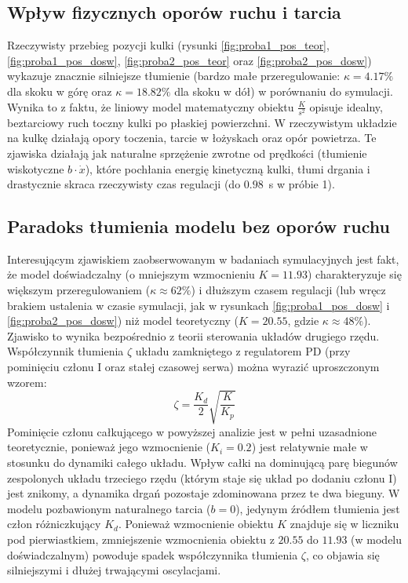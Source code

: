 \subsection{Wpływ fizycznych oporów ruchu i tarcia}
Rzeczywisty przebieg pozycji kulki (rysunki \ref{fig:proba1_pos_teor},
\ref{fig:proba1_pos_dosw}, \ref{fig:proba2_pos_teor} oraz
\ref{fig:proba2_pos_dosw}) wykazuje znacznie silniejsze tłumienie (bardzo małe
przeregulowanie: $\kappa = 4.17\%$ dla skoku w górę oraz $\kappa = 18.82\%$ dla
skoku w dół) w porównaniu do symulacji. Wynika to z faktu, że
liniowy model matematyczny obiektu $\frac{K}{s^2}$ opisuje idealny, beztarciowy
ruch toczny kulki po płaskiej powierzchni. W rzeczywistym układzie na kulkę
działają opory toczenia, tarcie w łożyskach oraz opór powietrza. Te zjawiska
działają jak naturalne sprzężenie zwrotne od prędkości (tłumienie wiskotyczne
$b\cdot\dot{x}$), które pochłania energię kinetyczną kulki, tłumi drgania
i drastycznie skraca rzeczywisty czas regulacji (do $0.98$~s w próbie 1).

\subsection{Paradoks tłumienia modelu bez oporów ruchu}
Interesującym zjawiskiem zaobserwowanym w badaniach symulacyjnych jest fakt,
że model doświadczalny (o mniejszym wzmocnieniu $K=11.93$) charakteryzuje się
większym przeregulowaniem ($\kappa \approx 62\%$) i dłuższym czasem regulacji
(lub wręcz brakiem ustalenia w czasie symulacji, jak w rysunkach
\ref{fig:proba1_pos_dosw} i \ref{fig:proba2_pos_dosw}) niż model teoretyczny
($K=20.55$, gdzie $\kappa \approx 48\%$). Zjawisko to wynika bezpośrednio
z teorii sterowania układów drugiego rzędu. Współczynnik tłumienia $\zeta$
układu zamkniętego z regulatorem PD (przy pominięciu członu I oraz stałej
czasowej serwa) można wyrazić uproszczonym wzorem:
\begin{equation}
    \zeta = \frac{K_d}{2} \sqrt{\frac{K}{K_p}}
\end{equation}
Pominięcie członu całkującego w powyższej analizie jest w pełni uzasadnione
teoretycznie, ponieważ jego wzmocnienie ($K_i = 0.2$) jest relatywnie małe
w stosunku do dynamiki całego układu. Wpływ całki na dominującą parę biegunów
zespolonych układu trzeciego rzędu (którym staje się układ po dodaniu członu I)
jest znikomy, a dynamika drgań pozostaje zdominowana przez te dwa bieguny.
W modelu pozbawionym naturalnego tarcia ($b=0$), jedynym źródłem tłumienia jest
człon różniczkujący $K_d$. Ponieważ wzmocnienie obiektu $K$ znajduje się
w liczniku pod pierwiastkiem, zmniejszenie wzmocnienia obiektu z $20.55$ do
$11.93$ (w modelu doświadczalnym) powoduje spadek współczynnika tłumienia
$\zeta$, co objawia się silniejszymi i dłużej trwającymi oscylacjami.

